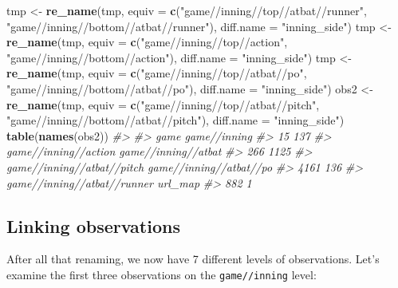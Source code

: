 \documentclass[12pt,]{isuthesis}
\newenvironment{Shaded}{\begin{snugshade}}{\end{snugshade}}
\newcommand{\KeywordTok}[1]{\textcolor[rgb]{0.13,0.29,0.53}{\textbf{{#1}}}}
\newcommand{\DataTypeTok}[1]{\textcolor[rgb]{0.13,0.29,0.53}{{#1}}}
\newcommand{\StringTok}[1]{\textcolor[rgb]{0.31,0.60,0.02}{{#1}}}
\newcommand{\CommentTok}[1]{\textcolor[rgb]{0.56,0.35,0.01}{\textit{{#1}}}}
\newcommand{\NormalTok}[1]{{#1}}
\begin{document}
\begin{Shaded}
\begin{Highlighting}[]
\NormalTok{tmp <-}\StringTok{ }\KeywordTok{re_name}\NormalTok{(tmp, }\DataTypeTok{equiv =} \KeywordTok{c}\NormalTok{(}\StringTok{"game//inning//top//atbat//runner"}\NormalTok{,                             }
  \StringTok{"game//inning//bottom//atbat//runner"}\NormalTok{), }\DataTypeTok{diff.name =} \StringTok{"inning_side"}\NormalTok{)}
\NormalTok{tmp <-}\StringTok{ }\KeywordTok{re_name}\NormalTok{(tmp, }\DataTypeTok{equiv =} \KeywordTok{c}\NormalTok{(}\StringTok{"game//inning//top//action"}\NormalTok{,                             }
  \StringTok{"game//inning//bottom//action"}\NormalTok{), }\DataTypeTok{diff.name =} \StringTok{"inning_side"}\NormalTok{)  }
\NormalTok{tmp <-}\StringTok{ }\KeywordTok{re_name}\NormalTok{(tmp, }\DataTypeTok{equiv =} \KeywordTok{c}\NormalTok{(}\StringTok{"game//inning//top//atbat//po"}\NormalTok{,                            }
  \StringTok{"game//inning//bottom//atbat//po"}\NormalTok{), }\DataTypeTok{diff.name =} \StringTok{"inning_side"}\NormalTok{)}
\NormalTok{obs2 <-}\StringTok{ }\KeywordTok{re_name}\NormalTok{(tmp, }\DataTypeTok{equiv =} \KeywordTok{c}\NormalTok{(}\StringTok{"game//inning//top//atbat//pitch"}\NormalTok{,                             }
  \StringTok{"game//inning//bottom//atbat//pitch"}\NormalTok{), }\DataTypeTok{diff.name =} \StringTok{"inning_side"}\NormalTok{) }
\KeywordTok{table}\NormalTok{(}\KeywordTok{names}\NormalTok{(obs2))}
\CommentTok{#> }
\CommentTok{#>                        game                game//inning }
\CommentTok{#>                          15                         137 }
\CommentTok{#>        game//inning//action         game//inning//atbat }
\CommentTok{#>                         266                        1125 }
\CommentTok{#>  game//inning//atbat//pitch     game//inning//atbat//po }
\CommentTok{#>                        4161                         136 }
\CommentTok{#> game//inning//atbat//runner                     url_map }
\CommentTok{#>                         882                           1}
\end{Highlighting}
\end{Shaded}

\subsection{Linking observations}\label{linking-observations}

After all that renaming, we now have 7 different levels of observations.
Let's examine the first three observations on the \texttt{game//inning}
level:
\end{document}
